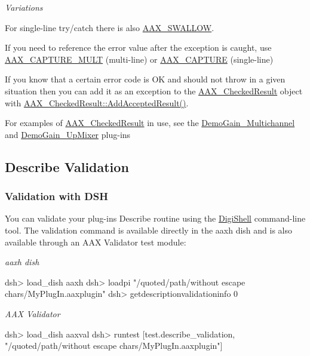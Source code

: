  {\itshape Variations}
\begin{DoxyItemize}
\item For single-\/line try/catch there is also \hyperlink{a00208_a8f177823e9388c5163d1b402a9069bce}{A\+A\+X\+\_\+\+S\+W\+A\+L\+L\+O\+W}.
\item If you need to reference the error value after the exception is caught, use \hyperlink{a00208_a078be92d3d19a5a4b3da2b55ae5ac1c9}{A\+A\+X\+\_\+\+C\+A\+P\+T\+U\+R\+E\+\_\+\+M\+U\+L\+T} (multi-\/line) or \hyperlink{a00208_af9972551e4546e894010f99eade68c94}{A\+A\+X\+\_\+\+C\+A\+P\+T\+U\+R\+E} (single-\/line)
\item If you know that a certain error code is O\+K and should not throw in a given situation then you can add it as an exception to the \hyperlink{a00019}{A\+A\+X\+\_\+\+Checked\+Result} object with \hyperlink{a00019_af6c4b10c55e959f5f8424514a3cbb68a}{A\+A\+X\+\_\+\+Checked\+Result\+::\+Add\+Accepted\+Result()}.
\end{DoxyItemize}

 For examples of \hyperlink{a00019}{A\+A\+X\+\_\+\+Checked\+Result} in use, see the \hyperlink{a00376_DemoGain_Multichannel}{Demo\+Gain\+\_\+\+Multichannel} and \hyperlink{a00376_DemoGain_UpMixer}{Demo\+Gain\+\_\+\+Up\+Mixer} plug-\/ins



 \hypertarget{a00326_describe_validation}{}\subsection{Describe Validation}\label{a00326_describe_validation}
\hypertarget{a00326_describe_validation_dsh}{}\subsubsection{Validation with D\+S\+H}\label{a00326_describe_validation_dsh}
 You can validate your plug-\/in\textquotesingle{}s Describe routine using the \hyperlink{a00365}{Digi\+Shell} command-\/line tool. The validation command is available directly in the aaxh dish and is also available through an A\+A\+X Validator test module\+:

 {\itshape aaxh dish} \begin{DoxyVerb}dsh> load_dish aaxh
dsh> loadpi "/quoted/path/without escape chars/MyPlugIn.aaxplugin"
dsh> getdescriptionvalidationinfo 0\end{DoxyVerb}


 {\itshape A\+A\+X Validator} \begin{DoxyVerb}dsh> load_dish aaxval
dsh> runtest [test.describe_validation, "/quoted/path/without escape chars/MyPlugIn.aaxplugin"]\end{DoxyVerb}


